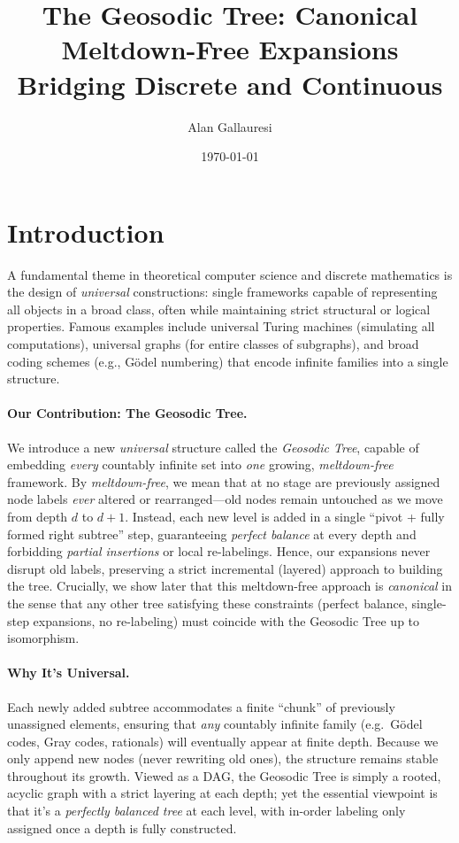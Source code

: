 \documentclass[acmsmall]{acmart}
\title{The Geosodic Tree: Canonical Meltdown-Free Expansions Bridging Discrete and Continuous}
\author{Alan Gallauresi}
\affiliation{
  \institution{Independent Researcher}
  \city{College Park}
  \country{United States}
}
\date{\today}
\theoremstyle{definition}
\theoremstyle{remark}
\begin{document}
\section{Introduction}
\label{sec:intro}

A fundamental theme in theoretical computer science and discrete mathematics 
is the design of \emph{universal} constructions: single frameworks capable 
of representing all objects in a broad class, often while maintaining 
strict structural or logical properties. Famous examples include 
universal Turing machines (simulating all computations), universal graphs 
(for entire classes of subgraphs), and broad coding schemes 
(e.g., G\"odel numbering) that encode infinite families into a single structure.

\paragraph{Our Contribution: The Geosodic Tree.}
We introduce a new \emph{universal} structure called the \emph{Geosodic Tree}, 
capable of embedding \emph{every} countably infinite set into \emph{one} 
growing, \emph{meltdown-free} framework. By \emph{meltdown-free}, we mean 
that at no stage are previously assigned node labels \emph{ever} altered 
or rearranged---old nodes remain untouched as we move from depth $d$ 
to $d+1$. Instead, each new level is added in a single ``pivot + fully formed 
right subtree'' step, guaranteeing \emph{perfect balance} at every depth 
and forbidding \emph{partial insertions} or local re-labelings. 
Hence, our expansions never disrupt old labels, preserving a strict 
incremental (layered) approach to building the tree.  Crucially, we show later that this meltdown-free
approach is \emph{canonical} in the sense that any other tree satisfying
these constraints (perfect balance, single-step expansions, no re-labeling)
must coincide with the Geosodic Tree up to isomorphism.

\paragraph{Why It’s Universal.}
Each newly added subtree accommodates a finite ``chunk'' of previously unassigned elements, 
ensuring that \emph{any} countably infinite family 
(e.g.\ G\"odel codes, Gray codes, rationals) 
will eventually appear at finite depth. Because we only append new nodes (never rewriting old ones),
the structure remains stable throughout its growth. Viewed as a DAG, the Geosodic Tree 
is simply a rooted, acyclic graph with a strict layering at each depth; yet the essential 
viewpoint is that it’s a \emph{perfectly balanced tree} at each level, with in-order labeling 
only assigned once a depth is fully constructed.
\end{document}
